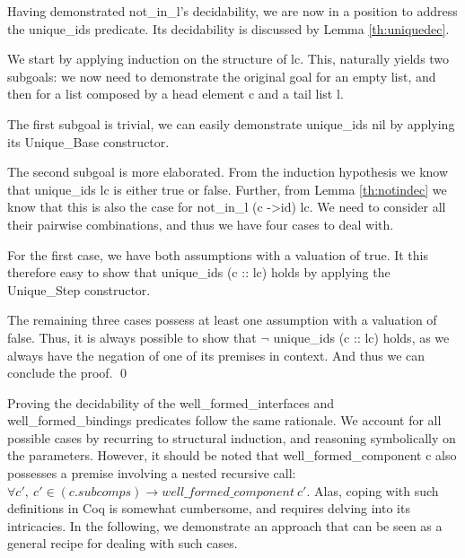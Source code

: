 		Having demonstrated \textsf{not\_in\_l}'s decidability, we are now in a position to
	address the \textsf{unique\_ids} predicate. Its decidability is discussed
	by Lemma \ref{th:uniquedec}.	
	
	\begin{lemma} \label{th:uniquedec} 
				
		
				We start by applying induction on the structure of \textsf{lc}. This, naturally yields
			two subgoals: we now need to demonstrate the original goal for an empty list,
			and then for a list composed by a head element \textsf{c} and a tail list \textsf{l}.
			
				The first subgoal is trivial, we can easily demonstrate \textsf{unique\_ids nil}
			by applying its \textsf{Unique\_Base} constructor.				
				
				The second subgoal is more elaborated. From the induction hypothesis
			we know that \textsf{unique\_ids lc} is either true or false. Further, 
			from Lemma \ref{th:notindec} we know that this is also the case for 
			\textsf{not\_in\_l (c ->id) lc}. We need to consider all their pairwise 
			combinations, and thus we have four cases to deal with. 
			
				For the first case, we have both assumptions with a valuation of true. 
				It this therefore easy to show that \textsf{unique\_ids (c :: lc)} holds by applying
			the \textsf{Unique\_Step} constructor.
			
				The remaining three cases possess at least one assumption with
			a valuation of false. Thus, it is always possible to show that
			\textsf{$\neg$ unique\_ids (c :: lc)} holds, as we always have
			the negation of one of its premises in context. And thus we can conclude
			the proof. \qed
	\end{lemma}
	
		\noindent Proving the decidability of the \textsf{well\_formed\_interfaces} and
	\textsf{well\_formed\_bindings} predicates follow the same rationale. We account for
	all possible cases by recurring to structural induction, and reasoning symbolically on
	the parameters. However, it should be noted that \textsf{well\_formed\_component c} 
	also possesses a premise involving a nested recursive call: \textsf{$\forall c',\ c' \in (c.subcomps)
	\rightarrow well\_formed\_component \ c'$}. Alas, coping with 
	such definitions in Coq is somewhat cumbersome, and requires delving into its
	intricacies. In the following, we demonstrate an approach that can be seen as a general
	recipe for dealing with such cases.
	
